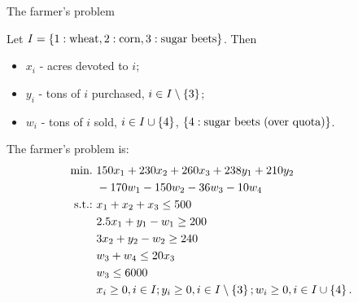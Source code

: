 \begin{frame}{The farmer's problem {\small \cite{birge2011introduction}}}
	
	Let $I=\left\{ 1:\text{wheat}, 2:\text{corn}, 3:\text{sugar beets} \right \}$. Then
	\vspace{-3pt}
	\begin{itemize}
		\item $x_i$	- acres devoted to $i$;
		\item $y_i$ - tons of $i$ purchased, $i \in I \setminus \left\{ 3 \right \}$;
		\item $w_i$ - tons of $i$ sold, $i \in I \cup \left\{ 4 \right \}$, $\left\{ 4: \text{sugar beets (over quota)} \right \}$.
	\end{itemize}
	
	\pause
	The farmer's problem is:
	\begin{align*}
		\mathop{\text{min.} \ } & 150x_1 + 230 x_2 + 260 x_3 + 238 y_1 + 210 y_2 \\ & - 170 w_1 - 150 w_2 - 36 w_3 - 10w_4 \\
		\mathop{\text{s.t.:} \ } & x_1 + x_2 + x_3 \le 500 \\
		& 2.5x_1 + y_1 - w_1 \ge 200 \\
		& 3 x_2 + y_2 - w_2 \ge 240 \\
		& w_3 + w_4 \le 20x_3 \\
		& w_3 \le 6000 \\
		& x_i \ge 0, i \in I; y_i \ge 0, i \in I \setminus \left\{ 3 \right \}; w_i \ge 0, i \in I \cup \left\{ 4 \right \}.
	\end{align*}
\end{frame}


